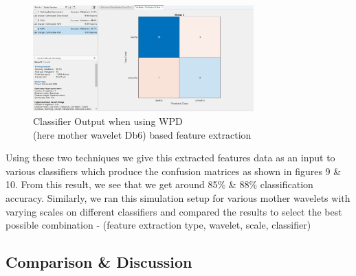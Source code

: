 \documentclass[10pt,twocolumn,letterpaper]{article}
\begin{document}
\begin{figure}[htbp]
\includegraphics[width=8.5cm]{WPD_result_db6.jpg}
\caption{Classifier Output when using WPD \\ (here mother wavelet Db6) based feature extraction}
\label{WPD Simulation}
\end{figure}
Using these two techniques we give this extracted features data as an input to various classifiers which produce the confusion matrices as shown in figures 9 \& 10. From this result, we see that we get around 85\% \& 88\% classification accuracy. Similarly, we ran this simulation setup for various mother wavelets with varying scales on different classifiers and compared the results to select the best possible combination - (feature extraction type, wavelet, scale, classifier)
\subsection{Comparison \& Discussion}
\end{document}
